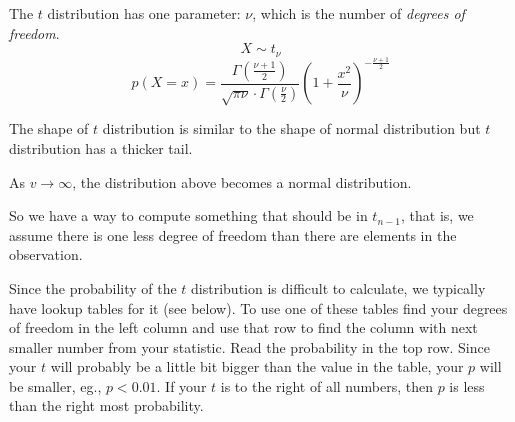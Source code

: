 \begin{aside}
The $t$ distribution has one parameter: $\nu$, which is the number of \textit{degrees of freedom}. 
\[X\sim t_\nu\]
\[p(X=x) = \frac{\Gamma\left(\frac{\nu+1}{2}\right)}{\sqrt{\pi\nu}\cdot\Gamma\left(\frac{\nu}{2}\right)}\left(1+\frac{x^2}{\nu}\right)^{-\frac{\nu+1}{2}}\]

The shape of $t$ distribution is similar to the shape of normal
distribution but $t$ distribution has a thicker tail.

\begin{center}
\end{center}

As $v\rightarrow\infty$, the distribution above becomes a normal distribution.

\end{aside}

So we have a way to compute something that should be in $t_{n-1}$, 
that is, we assume there is one less degree of freedom than there are elements in the observation. 

Since the probability of the $t$ distribution is difficult to calculate, we typically have lookup tables for it (see below). 
To use one of these tables find your degrees of freedom in the left column and use that row
to find the column with next smaller number from your statistic.
Read the probability in the top row. 
Since your $t$ will probably be a little bit bigger than the value in the table, 
your $p$ will be smaller, eg., $p<0.01$.
If your $t$ is to the right of all numbers, then $p$ is less than the right most probability. 



